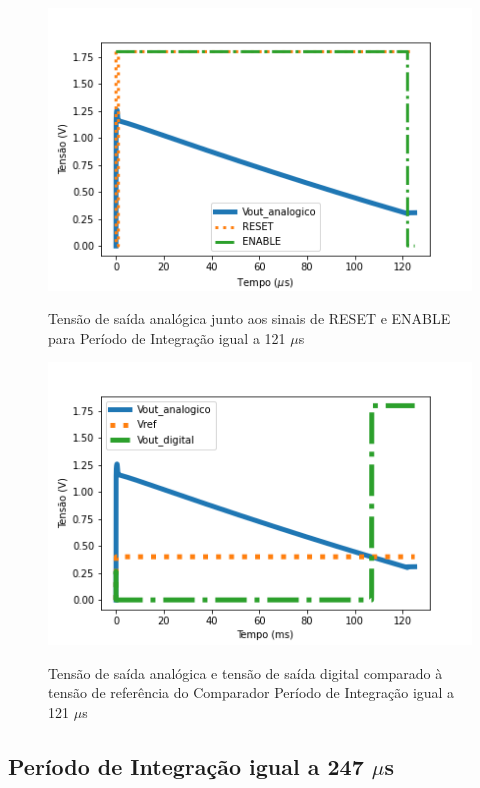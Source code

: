 \begin{figure}[!h]
 \centering
    \centering
    \caption{Tensão de saída analógica junto aos sinais de RESET e ENABLE para Período de Integração igual a 121 $\mu$s}
    \includegraphics[scale=0.6]{Resultados/Graficos/reseteenable-tb_pixel125.png}
    \label{graf125}
\end{figure}

\begin{figure}[!h]
 \centering
    \caption{Tensão de saída analógica e tensão de saída digital comparado à tensão de referência do Comparador Período de Integração igual a 121 $\mu$s} 
    \includegraphics[scale=0.6]{Resultados/Graficos/analogicoedigital-tb_pixel125.png}
    \label{graf1252}
\end{figure}

\subsection{Período de Integração igual a 247 $\mu$s}
\label{sub_sec247}

